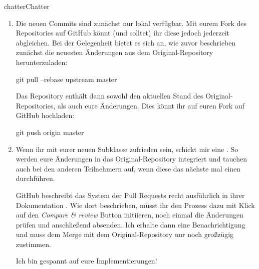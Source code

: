 \documentclass[parskip=half, final]{scrreprt}
\begin{document}
\begin{lecture}
\begin{exc}
\begin{excitem}{chatter}{Chatter}
\begin{enumerate}[label=\roman*.]
\begin{shlst}
git add filename # Achtet bitte darauf, nur Änderungen eurer Subklasse und nur wenn nötig Änderungen in anderen Dateien zu committen
git status # häufig den Status prüfen
git commit -m"describe your changes here"
\end{shlst}

\item Die neuen Commits sind zunächst nur lokal verfügbar. Mit eurem Fork des Repositories auf GitHub könnt (und solltet) ihr diese jedoch jederzeit abgleichen. Bei der Gelegenheit bietet es sich an, wie zuvor beschrieben zunächst die neuesten Änderungen aus dem Original-Repository herunterzuladen:

\begin{shlst}
git pull --rebase upstream master
\end{shlst}

Das Repository enthält dann sowohl den aktuellen Stand des Original-Repositories, als auch eure Änderungen. Dies könnt ihr auf euren Fork auf GitHub hochladen:

\begin{shlst}
git push origin master
\end{shlst}

\item Wenn ihr mit eurer neuen  Subklasse zufrieden sein, schickt mir eine . So werden eure Änderungen in das Original-Repository integriert und tauchen auch bei den anderen Teilnehmern auf, wenn diese das nächste mal einen  durchführen.

GitHub beschreibt das System der Pull Requests recht ausführlich in ihrer Dokumentation . Wie dort beschrieben, müsst ihr den Prozess dazu mit Klick auf den \emph{Compare \& review} Button initiieren, noch einmal die Änderungen prüfen und anschließend absenden. Ich erhalte dann eine Benachrichtigung und muss dem Merge mit dem Original-Repository nur noch großzügig zustimmen.

Ich bin gespannt auf eure Implementierungen!

\end{enumerate}

\end{excitem}

\end{exc}


\end{lecture}
\end{document}
